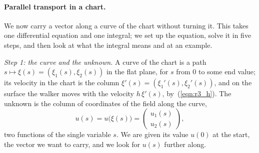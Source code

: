 \paragraph{Parallel transport in a chart.} We now carry a vector along a curve of the chart without turning it. This takes one differential equation and one integral; we set up the equation, solve it in five steps, and then look at what the integral means and at an example.

\emph{Step 1: the curve and the unknown.} A curve of the chart is a path $s \mapsto \xi(s) = (\xi_1(s), \xi_2(s))$ in the flat plane, for $s$ from $0$ to some end value; its velocity in the chart is the column $\xi'(s) = (\xi_1'(s), \xi_2'(s))$, and on the surface the walker moves with the velocity $h\,\xi'(s)$, by~(\ref{eqn:r3_h}). The unknown is the column of coordinates of the field along the curve,
\begin{equation*}
u(s) = u\big(\xi(s)\big) = \begin{pmatrix} u_1(s) \\ u_2(s) \end{pmatrix} ,
\end{equation*}
two functions of the single variable $s$. We are given its value $u(0)$ at the start, the vector we want to carry, and we look for $u(s)$ further along.

